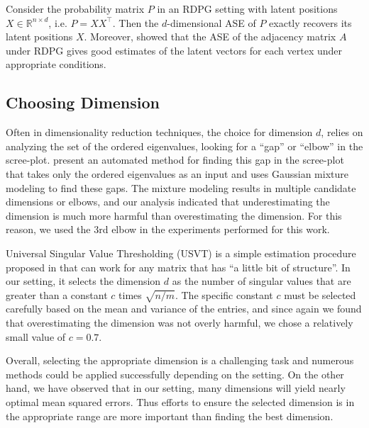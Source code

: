 Consider the probability matrix $P$ in an RDPG setting with latent positions $X \in \mathbb{R}^{n \times d}$, i.e. $P = X X^{\top}$. Then the $d$-dimensional ASE of $P$ exactly recovers its latent positions $X$.
Moreover, \citet{sussman2014consistent} showed that the ASE of the adjacency matrix $A$ under RDPG gives good estimates of the latent vectors for each vertex under appropriate conditions.




\subsection{Choosing Dimension}
\label{sec:dim_select}
Often in dimensionality reduction techniques, the choice for dimension $d$, relies on analyzing the set of the ordered eigenvalues, looking for a ``gap'' or ``elbow'' in the scree-plot. \citet{zhu2006automatic} present an automated method for finding this gap in the scree-plot that takes only the ordered eigenvalues as an input and uses Gaussian mixture modeling to find these gaps.
The mixture modeling results in multiple candidate dimensions or elbows, and our analysis indicated that underestimating the dimension is much more harmful than overestimating the dimension.
For this reason, we used the 3rd elbow in the experiments performed for this work.

Universal Singular Value Thresholding (USVT) is a simple estimation procedure proposed in \citet{chatterjee2015matrix} that can work for any matrix that has ``a little bit of structure''. 
In our setting, it selects the dimension $d$ as the number of singular values that are greater than a constant $c$ times $\sqrt{n/m}$.
The specific constant $c$ must be selected carefully based on the mean and variance of the entries, and since again we found that overestimating the dimension was not overly harmful, we chose a relatively small value of $c=0.7$.

Overall, selecting the appropriate dimension is a challenging task and numerous methods could be applied successfully depending on the setting.
On the other hand, we have observed that in our setting, many dimensions will yield nearly optimal mean squared errors. 
Thus efforts to ensure the selected dimension is in the appropriate range are more important than finding the best dimension.





